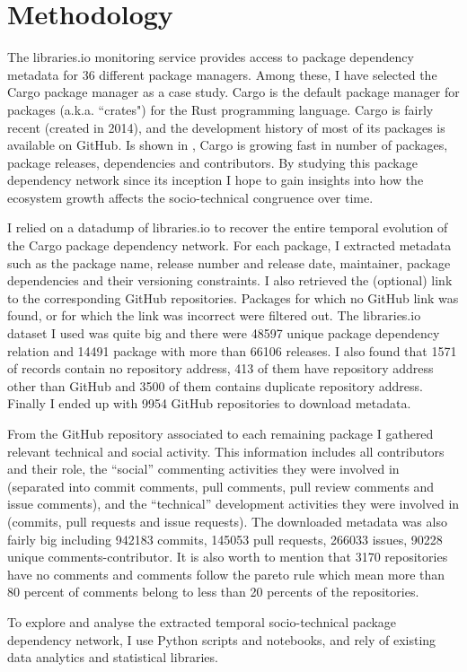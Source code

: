 \section{Methodology}

The \textsf{libraries.io} monitoring service provides access to package dependency metadata for 36 different package managers.
Among these, I have selected the Cargo package manager as a case study. Cargo is the default package manager for packages (a.k.a. ``crates") for the Rust programming language. Cargo is fairly recent (created in 2014), and the development history of most of its packages is available on GitHub. 
Is shown in \cite{Decan2019EMSE}, Cargo is growing fast in number of packages, package releases, dependencies and contributors. 
By studying this package dependency network since its inception I hope to gain insights into how the ecosystem growth affects the socio-technical congruence over time.

I relied on a datadump of libraries.io \cite{Katz2018} to recover the entire temporal evolution of the Cargo package dependency network. 
For each package, I extracted metadata such as the package name, release number and release date, maintainer, package dependencies and their versioning constraints. I also retrieved the (optional) link to the corresponding GitHub repositories. Packages for which no GitHub link was found, or for which the link was incorrect were filtered out. The libraries.io dataset I used was quite big and there were 48597 unique package dependency relation and 14491 package with more than 66106 releases. I also found that 1571 of records contain no repository address, 413 of them have repository address other than GitHub and 3500 of them contains duplicate repository address. Finally I ended up with 9954 GitHub repositories to download metadata.

From the GitHub repository associated to each remaining package I gathered relevant technical and social activity. This information includes all contributors and their role, the ``social'' commenting activities they were involved in (separated into commit comments, pull comments, pull review comments and issue comments), and the ``technical'' development activities they were involved in (commits, pull requests and issue requests). The downloaded metadata was also fairly big including 942183 commits, 145053 pull requests, 266033 issues, 90228 unique comments-contributor. It is also worth to mention that 3170 repositories have no comments and comments follow the pareto rule which mean more than 80 percent of comments belong to less than 20 percents of the repositories.

To explore and analyse the extracted temporal socio-technical package dependency network, I use Python scripts and notebooks, and rely of existing data analytics and statistical libraries.

